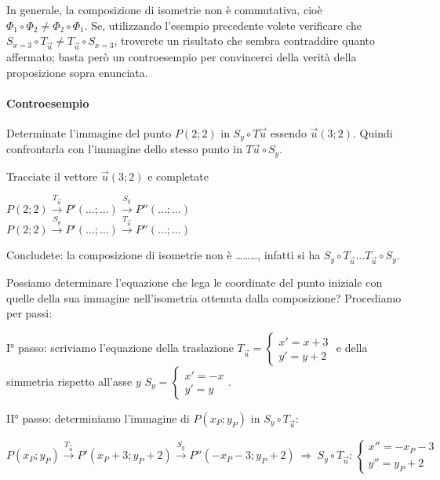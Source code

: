 In generale, la composizione di isometrie non è commutativa, cioè $\Phi_1\circ\Phi_2 \neq \Phi_2\circ\Phi_1$.
Se, utilizzando l'esempio precedente volete verificare che $S_{x=3}\circ T_{\vec{u}} \neq T_{\vec{u}}\circ S_{x=3}$, troverete un risultato che sembra contraddire quanto affermato; basta però un controesempio per convincerci della verità della proposizione sopra enunciata. 
			
\paragraph{Controesempio}
Determinate l'immagine del punto $P(2;2)$ in $S_y \circ T{\vec{u}}$ essendo $\vec{u}(3;2)$. Quindi confrontarla con l'immagine dello stesso punto in $T{\vec{u}}\circ S_y$.\vspace{7pt}
			
Tracciate il vettore $\vec{u}(3;2)$ e completate
			
\noindent $P(2;2) \overset{T_{\vec{u}}}\rightarrow P'(\ldots{};\ldots{}) \overset{S_y}\rightarrow P''(\ldots{};\ldots{})$\\
$P(2;2) \overset{S_y}\rightarrow P'(\ldots{};\ldots{}) \overset{T_{\vec{u}}}\rightarrow P''(\ldots{};\ldots{})$
			
Concludete: la composizione di isometrie non è \ldots\ldots\ldots{}, infatti si ha $S_y \circ T_{\vec{u}} \ldots{} T_{\vec{u}} \circ S_y$.
			
Possiamo determinare l'equazione che lega le coordinate del punto iniziale con quelle della sua immagine nell'isometria ottenuta dalla composizione? Procediamo per passi:
			
I° passo: scriviamo l'equazione della traslazione $T_{\vec{u}}=\begin{cases}x'=x+3\\y'=y+2\end{cases}$ e della simmetria rispetto all'asse $y$ $S_y=\begin{cases}x'=-x\\y'=y\end{cases}$.
			
II° passo: determiniamo l'immagine di $P(x_P;y_P)$ in $S_y \circ T_{\vec{u}}$:
			
\[P(x_P;y_P)\overset{T_{\vec{u}}}\rightarrow P'(x_P+3;y_P+2) \overset{S_y}\rightarrow P''(-x_P-3;y_P+2)\:\Rightarrow\: S_y\circ T_{\vec{u}}:\begin{cases}x''=-x_P-3\\ y''=y_P+2\end{cases}\]
			
